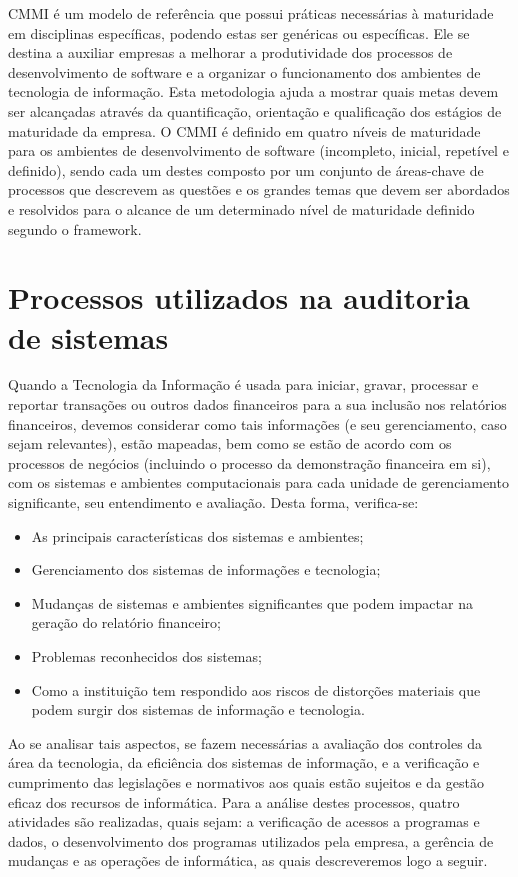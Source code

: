 	CMMI é um modelo de referência que possui práticas necessárias à maturidade em disciplinas específicas, podendo estas ser genéricas ou específicas. Ele se destina a auxiliar empresas a melhorar a produtividade dos processos de desenvolvimento de software e a organizar o funcionamento dos ambientes de tecnologia de informação. Esta metodologia ajuda a mostrar quais metas devem ser alcançadas através da quantificação, orientação e qualificação dos estágios de maturidade da empresa.
	O CMMI é definido em quatro níveis de maturidade para os ambientes de desenvolvimento de software (incompleto, inicial, repetível e definido), sendo cada um destes composto por um conjunto de áreas-chave de processos que descrevem as questões e os grandes temas que devem ser abordados e resolvidos para o alcance de um determinado nível de maturidade definido segundo o framework. 
	\cite{CMMI}
	
\section{Processos utilizados na auditoria de sistemas}
	
	Quando a Tecnologia da Informação é usada para iniciar, gravar, processar e reportar transações ou outros dados financeiros para a sua inclusão nos relatórios financeiros, devemos considerar como tais informações (e seu gerenciamento, caso sejam relevantes), estão mapeadas, bem como se estão de acordo com os processos de negócios (incluindo o processo da demonstração financeira em si), com os sistemas e ambientes computacionais para cada unidade de gerenciamento significante, seu entendimento e avaliação. Desta forma, verifica-se:
\begin{itemize}
    \item As principais características dos sistemas e ambientes;
    \item Gerenciamento dos sistemas de informações e tecnologia;
    \item Mudanças de sistemas e ambientes significantes que podem impactar na geração do relatório financeiro;
    \item Problemas reconhecidos dos sistemas;
    \item Como a instituição tem respondido aos riscos de distorções materiais que podem surgir dos sistemas de informação e tecnologia.
\end{itemize}


	Ao se analisar tais aspectos, se fazem necessárias a avaliação dos controles da área da tecnologia, da eficiência dos sistemas de informação, e a verificação e cumprimento das legislações e normativos aos quais estão sujeitos e da gestão eficaz dos recursos de informática. Para a análise destes processos, quatro atividades são realizadas, quais sejam: a verificação de acessos a programas e dados, o desenvolvimento dos programas utilizados pela empresa, a gerência de mudanças e as operações de informática, as quais descreveremos logo a seguir.	

